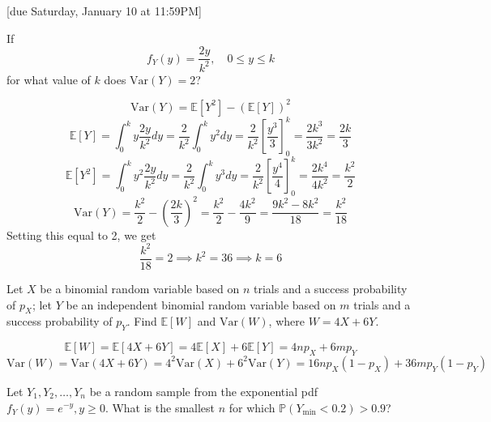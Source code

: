 \documentclass{article}
\newcommand{\E}{\mathbb{E}}
\newcommand{\V}{\text{Var}}
\renewcommand{\P}{\mathbb{P}}
\begin{document}
[due Saturday, January 10 at 11:59PM]

\begin{probset}
\begin{prob}[\textbf{3.6.6}]
    If
    \[f_Y(y) = \frac{2y}{k^2}, \quad 0 \leq y \leq k\]
    for what value of $k$ does $\V(Y) = 2$?

    \begin{soln}
        \[
            \V(Y) = \E[Y^2] - (\E[Y])^2
        \]
        \[
            \E[Y] = \int_0^k y \frac{2y}{k^2} dy = \frac{2}{k^2} \int_0^k y^2 dy = \frac{2}{k^2} \left[ \frac{y^3}{3} \right]_0^k = \frac{2k^3}{3k^2} = \frac{2k}{3}
        \]
        \[
            \E[Y^2] = \int_0^k y^2 \frac{2y}{k^2} dy = \frac{2}{k^2} \int_0^k y^3 dy = \frac{2}{k^2} \left[ \frac{y^4}{4} \right]_0^k = \frac{2k^4}{4k^2} = \frac{k^2}{2}
        \]
        \[
            \V(Y) = \frac{k^2}{2} - \left( \frac{2k}{3} \right)^2 = \frac{k^2}{2} - \frac{4k^2}{9} = \frac{9k^2 - 8k^2}{18} = \frac{k^2}{18}
        \]
        Setting this equal to 2, we get
        \[
            \frac{k^2}{18} = 2 \implies k^2 = 36 \implies k = 6
        \]
    \end{soln}
\end{prob}

\begin{prob}[\textbf{3.9.20}]
    Let $X$ be a binomial random variable based on $n$ trials and a success probability of $p_X$; let $Y$ be an independent binomial random variable based on $m$ trials and a success probability of $p_Y$. Find $\E[W]$ and $\V(W)$, where $W = 4X + 6Y$.

    \begin{soln}
        \[
            \E[W] = \E[4X + 6Y] = 4\E[X] + 6\E[Y] = 4np_X + 6mp_Y
        \]
        \[
            \V(W) = \V(4X + 6Y) = 4^2\V(X) + 6^2\V(Y) = 16np_X(1-p_X) + 36mp_Y(1-p_Y)
        \]
    \end{soln}
\end{prob}

\newpage

\begin{prob}[\textbf{3.10.6}]
    Let $Y_1, Y_2, \ldots, Y_n$ be a random sample from the exponential pdf $f_Y(y) = e^{-y}, y \geq 0$. What is the smallest $n$ for which $\P(Y_{\min} < 0.2) > 0.9$?


\end{prob}
\end{probset}
\end{document}
